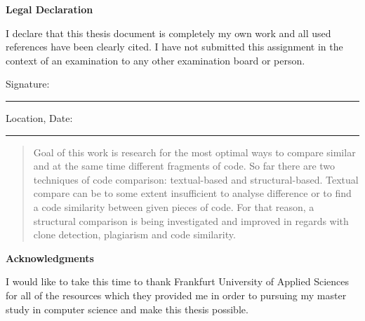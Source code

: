 \documentclass{report}
\begin{document}
\onehalfspacing
\null\vfil
\begin{center}{\huge\bf Legal Declaration\par}\end{center}
\null
I declare that this thesis document is completely my own work and all used references have been clearly cited. I have not submitted this assignment in the context of an examination to any other examination board or person.\\[2.5cm]

\begin{flushleft}
Signature:\\
\rule[1em]{25em}{0.5pt} %
 
Location, Date:\\
\rule[1em]{25em}{0.5pt} %
\end{flushleft}


\newpage
\pagestyle{fancy}
\fancyhead{}
\renewcommand{\headrulewidth}{0pt}
\renewcommand{\footrulewidth}{0.4pt}
\begin{abstract}
\large


Goal of this work is research for the most optimal ways to compare similar and at the same time different fragments of code. So far there are two techniques of code comparison: textual-based and structural-based. Textual compare can be to some extent insufficient to analyse difference or to find a code similarity between given pieces of code. For that reason, a structural comparison is being investigated and improved in regards with clone detection, plagiarism and code similarity.

\end{abstract}

\newpage
\begin{center}{\huge\bf Acknowledgments\par}\end{center}
\null
I would like to take this time to thank Frankfurt University of Applied Sciences for all of the resources which they provided me in order to pursuing my master study in computer science and make this thesis possible.\vspace{5 mm}
\end{document}
